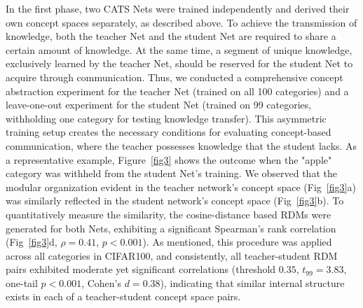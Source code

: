 \documentclass[pdflatex,sn-mathphys-num,lineno]{sn-jnl}%
\begin{document}
\begin{CJK}{UTF8}{gbsn}
In the first phase, two CATS Nets were trained independently and derived their own concept spaces separately, as described above. To achieve the transmission of knowledge, both the teacher Net and the student Net are required to share a certain amount of knowledge. At the same time, a segment of unique knowledge, exclusively learned by the teacher Net, should be reserved for the student Net to acquire through communication. Thus, we conducted a comprehensive concept abstraction experiment for the teacher Net (trained on all 100 categories) and a leave-one-out experiment for the student Net (trained on 99 categories, withholding one category for testing knowledge transfer). This asymmetric training setup creates the necessary conditions for evaluating concept-based communication, where the teacher possesses knowledge that the student lacks. As a representative example, Figure~\ref{fig3} shows the outcome when the "apple" category was withheld from the student Net's training. We observed that the modular organization evident in the teacher network's concept space (Fig~\ref{fig3}a) was similarly reflected in the student network's concept space (Fig~\ref{fig3}b). To quantitatively measure the similarity, the cosine-distance based RDMs were generated for both Nets, exhibiting a significant Spearman’s rank correlation (Fig~\ref{fig3}d, $\rho=0.41$, $p < 0.001$). As mentioned, this procedure was applied across all categories in CIFAR100, and consistently, all teacher-student RDM pairs exhibited moderate yet significant correlations (threshold $0.35$, $t_{99}=3.83$, one-tail $p < 0.001$, Cohen's $d = 0.38$), indicating that similar internal structure exists in each of a teacher-student concept space pairs.


\end{CJK}
\end{document}
